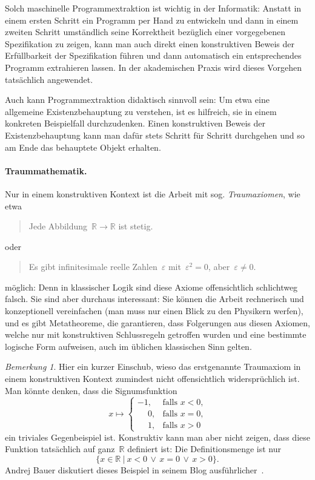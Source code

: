 \documentclass[a4paper,ngerman,12pt]{scrartcl}
\theoremstyle{definition}
\theoremstyle{plain}
\theoremstyle{remark}
\newtheorem{bem}[defn]{Bemerkung}
\newcommand{\RR}{\mathbb{R}}
\renewcommand{\_}{\mathpunct{.}\,}
\newcommand{\?}{\,{:}\,}
\begin{document}
Solch maschinelle
Programmextraktion ist wichtig in der Informatik: Anstatt in einem ersten
Schritt ein Programm per Hand zu entwickeln und dann in einem zweiten
Schritt umständlich seine Korrektheit bezüglich einer vorgegebenen
Spezifikation zu zeigen, kann man auch direkt einen konstruktiven Beweis der
Erfüllbarkeit der Spezifikation führen und dann automatisch ein entsprechendes
Programm extrahieren lassen. In der akademischen Praxis wird dieses Vorgehen
tatsächlich angewendet.

Auch kann Programmextraktion didaktisch sinnvoll sein: Um etwa eine allgemeine
Existenzbehauptung zu verstehen, ist es hilfreich, sie in einem konkreten
Beispielfall durchzudenken. Einen konstruktiven Beweis der Existenzbehauptung
kann man dafür stets Schritt für Schritt durchgehen und so am Ende das behauptete
Objekt erhalten.

\paragraph{Traummathematik.} Nur in einem konstruktiven Kontext ist die Arbeit
mit sog. \emph{Traum\-axio\-men}, wie etwa
\begin{quote}Jede Abbildung~$\RR \to \RR$ ist stetig.\end{quote}
oder
\begin{quote}Es gibt infinitesimale reelle Zahlen~$\varepsilon$
mit~$\varepsilon^2 = 0$, aber~$\varepsilon \neq 0$.\end{quote}
möglich: Denn in klassischer Logik sind diese Axiome offensichtlich schlichtweg
falsch. Sie sind aber durchaus interessant: Sie können die Arbeit
rechnerisch und konzeptionell vereinfachen (man muss nur einen Blick zu den
Physikern werfen), und es gibt Metatheoreme, die garantieren, dass Folgerungen
aus diesen Axiomen, welche nur mit konstruktiven Schlussregeln getroffen wurden
und eine bestimmte logische Form aufweisen, auch im üblichen klassischen Sinn
gelten.

\begin{bem}Hier ein kurzer Einschub, wieso das erstgenannte Traumaxiom
in einem konstruktiven Kontext zumindest nicht offensichtlich widersprüchlich
ist. Man könnte denken, dass die Signumsfunktion
\[ x \longmapsto \begin{cases}
  -1, & \text{falls $x < 0$,} \\
  \phantom{+}0, & \text{falls $x = 0$,} \\
  \phantom{+}1, & \text{falls $x > 0$}
\end{cases} \]
ein triviales Gegenbeispiel ist. Konstruktiv kann man aber nicht zeigen, dass
diese Funktion tatsächlich auf ganz~$\RR$ definiert ist: Die Definitionsmenge
ist nur
\[ \{ x \in \RR \ |\  x < 0 \,\vee\, x = 0 \,\vee\, x > 0 \}. \]
Andrej Bauer diskutiert dieses Beispiel in seinem Blog
ausführlicher~\cite{bauer:blog:stetigkeit}.
\end{bem}
\end{document}

